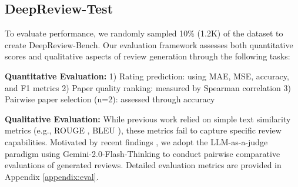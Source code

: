 \documentclass{article}
\begin{document}

\subsection{DeepReview-Test}
To evaluate performance, we randomly sampled 10\% (1.2K) of the dataset to create DeepReview-Bench. Our evaluation framework assesses both quantitative scores and qualitative aspects of review generation through the following tasks:

\textbf{Quantitative Evaluation:}
1) Rating prediction: using MAE, MSE, accuracy, and F1 metrics
2) Paper quality ranking: measured by Spearman correlation
3) Pairwise paper selection (n=2): assessed through accuracy

\textbf{Qualitative Evaluation:}
While previous work \citep{tan2024peerreviewmultiturnlongcontext} relied on simple text similarity metrics (e.g., ROUGE \citep{lin-2004-rouge}, BLEU \citep{10.3115/1073083.1073135}), these metrics fail to capture specific review capabilities. Motivated by recent findings \citep{li2024llmasajudge}, we adopt the LLM-as-a-judge paradigm using Gemini-2.0-Flash-Thinking to conduct pairwise comparative evaluations of generated reviews. Detailed evaluation metrics are provided in Appendix \ref{appendix:eval}.
\end{document}
